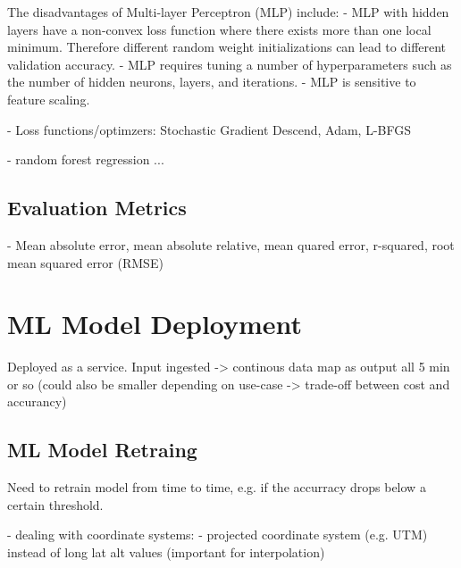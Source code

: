 The disadvantages of Multi-layer Perceptron (MLP) include:
- MLP with hidden layers have a non-convex loss function where there exists more than one local minimum. Therefore different random weight initializations can lead to different validation accuracy.
- MLP requires tuning a number of hyperparameters such as the number of hidden neurons, layers, and iterations.
- MLP is sensitive to feature scaling.

- Loss functions/optimzers: Stochastic Gradient Descend, Adam, L-BFGS


- random forest regression
...

\subsection{Evaluation Metrics}
- Mean absolute error, mean absolute relative, mean quared error, r-squared, root mean squared error (RMSE)

\section{ML Model Deployment}
Deployed as a service. Input ingested -> continous data map as output all 5 min or so (could also be smaller depending on use-case -> trade-off between cost and accurancy)

\subsection{ML Model Retraing}
Need to retrain model from time to time, e.g. if the accurracy drops below a certain threshold.


- dealing with coordinate systems:
    - projected coordinate system (e.g. UTM) instead of long lat alt values (important for interpolation)